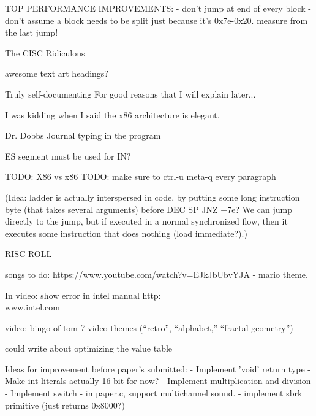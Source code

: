 \documentclass[twocolumn]{article}
\begin{document}
 TOP PERFORMANCE IMPROVEMENTS:
  - don't jump at end of every block
  - don't assume a block needs to be split just because it's 0x7e-0x20.
    measure from the last jump!

The CISC Ridiculous

awesome text art headings?

Truly self-documenting
For good reasons that I will explain later...

I was kidding when I said the x86 architecture is elegant.

Dr. Dobbs Journal typing in the program

ES segment must be used for IN?

TODO: X86 vs x86
TODO: make sure to ctrl-u meta-q every paragraph

(Idea: ladder is actually interspersed in code, by putting some long instruction
byte (that takes several arguments) before DEC SP JNZ +7e? We can jump directly
to the jump, but if executed in a normal synchronized flow, then it executes some
instruction that does nothing (load immediate?).)

RISC ROLL

songs to do: https://www.youtube.com/watch?v=EJkJbUbvYJA
 - mario theme.

In video: show error in intel manual http:\\www.intel.com

video: bingo of tom 7 video themes (``retro'', ``alphabet,''
``fractal geometry'')

could write about optimizing the value table

Ideas for improvement before paper's submitted:
 - Implement 'void' return type
 - Make int literals actually 16 bit for now?
 - Implement multiplication and division
 - Implement switch
 - in paper.c, support multichannel sound.
 - implement sbrk primitive (just returns 0x8000?)
 


\end{document}

